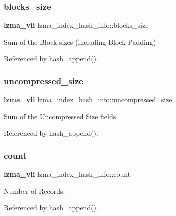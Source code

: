 \subsubsection{blocks\+\_\+size}
{\footnotesize\ttfamily \textbf{ lzma\+\_\+vli} lzma\+\_\+index\+\_\+hash\+\_\+info\+::blocks\+\_\+size}



Sum of the Block sizes (including Block Padding) 



Referenced by hash\+\_\+append().

\mbox{\label{structlzma__index__hash__info_af8e5b919ce7c763da5d845a29f4f3fb3}} 
\subsubsection{uncompressed\+\_\+size}
{\footnotesize\ttfamily \textbf{ lzma\+\_\+vli} lzma\+\_\+index\+\_\+hash\+\_\+info\+::uncompressed\+\_\+size}



Sum of the Uncompressed Size fields. 



Referenced by hash\+\_\+append().

\mbox{\label{structlzma__index__hash__info_ad67ca290ff1a9ccd4c70e65cef0d5237}} 
\subsubsection{count}
{\footnotesize\ttfamily \textbf{ lzma\+\_\+vli} lzma\+\_\+index\+\_\+hash\+\_\+info\+::count}



Number of Records. 



Referenced by hash\+\_\+append().

\mbox{\label{structlzma__index__hash__info_a8773b43db5844301d26033342ddbc0ab}} 
